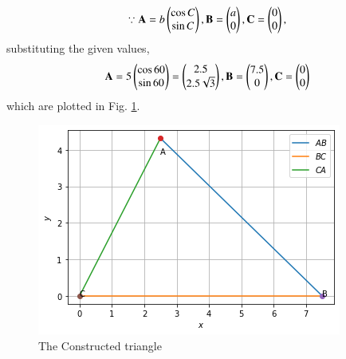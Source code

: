 
\begin{align}
\because     \mathbf{A} = b\begin{pmatrix}\cos C\\ \sin C\end{pmatrix}, \mathbf{B} = \begin{pmatrix}a\\0\end{pmatrix}, \mathbf{C} = \begin{pmatrix}0\\0\end{pmatrix},
    \end{align}
    substituting the given values, 
    \begin{align}
        \mathbf{A} = 5\begin{pmatrix}\cos60\\ \sin60\end{pmatrix} = \begin{pmatrix}2.5\\2.5\sqrt3\end{pmatrix},  \mathbf{B} = \begin{pmatrix}7.5\\0\end{pmatrix},  \mathbf{C} = \begin{pmatrix}0\\0\end{pmatrix}
        \end{align}
    which are plotted in Fig. \ref{constr/july/2Figure}.       

\begin{figure}[!h]
         \centering
         \includegraphics[width= \columnwidth]{solutions/july/2/2/Figures/Figure 1.png}
         \caption{The Constructed triangle}
         \label{constr/july/2Figure}
\end{figure}



